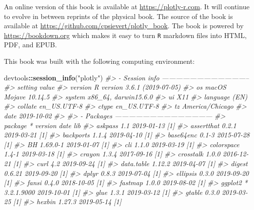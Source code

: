 \documentclass[
  12pt,
]{krantz}
\newenvironment{Shaded}{\begin{snugshade}}{\end{snugshade}}
\newcommand{\CommentTok}[1]{\textcolor[rgb]{0.56,0.35,0.01}{\textit{#1}}}
\newcommand{\KeywordTok}[1]{\textcolor[rgb]{0.13,0.29,0.53}{\textbf{#1}}}
\newcommand{\NormalTok}[1]{#1}
\newcommand{\OperatorTok}[1]{\textcolor[rgb]{0.81,0.36,0.00}{\textbf{#1}}}
\newcommand{\StringTok}[1]{\textcolor[rgb]{0.31,0.60,0.02}{#1}}
\begin{document}
An online version of this book is available at \url{https://plotly-r.com}. It will continue to evolve in between reprints of the physical book. The source of the book is available at \url{https://github.com/cpsievert/plotly_book}. The book is powered by \url{https://bookdown.org} which makes it easy to turn \texttt{R} markdown files into HTML, PDF, and EPUB.

This book was built with the following computing environment:

\begin{Shaded}
\begin{Highlighting}[]
\NormalTok{devtools}\OperatorTok{::}\KeywordTok{session_info}\NormalTok{(}\StringTok{"plotly"}\NormalTok{)}
\CommentTok{#> - Session info --------------------------------------}
\CommentTok{#>  setting  value                       }
\CommentTok{#>  version  R version 3.6.1 (2019-07-05)}
\CommentTok{#>  os       macOS Mojave 10.14.5        }
\CommentTok{#>  system   x86_64, darwin15.6.0        }
\CommentTok{#>  ui       X11                         }
\CommentTok{#>  language (EN)                        }
\CommentTok{#>  collate  en_US.UTF-8                 }
\CommentTok{#>  ctype    en_US.UTF-8                 }
\CommentTok{#>  tz       America/Chicago             }
\CommentTok{#>  date     2019-10-02                  }
\CommentTok{#> }
\CommentTok{#> - Packages ------------------------------------------}
\CommentTok{#>  package      * version    date       lib}
\CommentTok{#>  askpass        1.1        2019-01-13 [1]}
\CommentTok{#>  assertthat     0.2.1      2019-03-21 [1]}
\CommentTok{#>  backports      1.1.4      2019-04-10 [1]}
\CommentTok{#>  base64enc      0.1-3      2015-07-28 [1]}
\CommentTok{#>  BH             1.69.0-1   2019-01-07 [1]}
\CommentTok{#>  cli            1.1.0      2019-03-19 [1]}
\CommentTok{#>  colorspace     1.4-1      2019-03-18 [1]}
\CommentTok{#>  crayon         1.3.4      2017-09-16 [1]}
\CommentTok{#>  crosstalk      1.0.0      2016-12-21 [1]}
\CommentTok{#>  curl           4.2        2019-09-24 [1]}
\CommentTok{#>  data.table     1.12.2     2019-04-07 [1]}
\CommentTok{#>  digest         0.6.21     2019-09-20 [1]}
\CommentTok{#>  dplyr          0.8.3      2019-07-04 [1]}
\CommentTok{#>  ellipsis       0.3.0      2019-09-20 [1]}
\CommentTok{#>  fansi          0.4.0      2018-10-05 [1]}
\CommentTok{#>  fastmap        1.0.0      2019-08-02 [1]}
\CommentTok{#>  ggplot2      * 3.2.1.9000 2019-10-01 [1]}
\CommentTok{#>  glue           1.3.1      2019-03-12 [1]}
\CommentTok{#>  gtable         0.3.0      2019-03-25 [1]}
\CommentTok{#>  hexbin         1.27.3     2019-05-14 [1]}

\end{Highlighting}
\end{Shaded}
\end{document}
